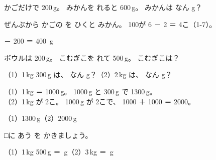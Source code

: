 
\begin{reidai}[おもさの ひき\R{算}{ざん}]
かごだけで 200\,g。 みかんを れると 600\,g。 みかんは なん g？
\begin{bkfigure}
\end{bkfigure}
\kangaekata ぜんぶから かごの を ひくと みかん。 100が 6 － 2 ＝ 4こ（1-7）。

 － 200 ＝ 400 \,g
\end{reidai}

\begin{jibun}
ボウルは 200\,g。 こむぎこを れて 500\,g。 こむぎこは？
\bkshikiran
{}
\end{jibun}

\begin{reidai}[kg と g を かえる]
（1）1\,kg 300\,g は、 なん g？\hspace{2\zw}（2）2\,kg は、 なん g？

\kangaekata （1）1\,kg ＝ 1000\,g。 1000\,g と 300\,g で 1300\,g。\\
（2）1\,kg が 2こ。 1000\,g が 2こで、 1000 ＋ 1000 ＝ 2000。

\kotae （1）1300\,g\hspace{3\zw}（2）2000\,g
\end{reidai}

\begin{jibun}
□に あう を かきましょう。\par\vspace{3pt}
\noindent\hspace*{1\zw}（1）1\,kg 500\,g ＝ \bkkakikomi[16mm]\,g\hspace{3\zw}（2）3\,kg ＝ \bkkakikomi[16mm]\,g
\end{jibun}

